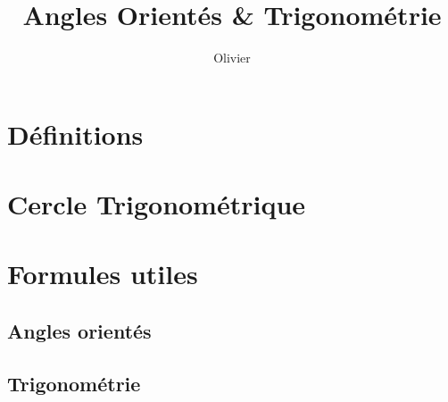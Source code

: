\documentclass[12pt,a4paper]{article}
\author{Olivier}
\date{}
\title{Angles Orientés \& Trigonométrie }
\begin{document}
\maketitle



\section{Définitions}

\begin{multicols}{2}
	
\end{multicols}



\section{Cercle Trigonométrique}


\begin{center}

\end{center}

\vspace*{2cm}

\section{Formules utiles}

\subsection*{Angles orientés}

\begin{multicols}{2}

\end{multicols}


\subsection*{Trigonométrie}

\begin{multicols}{2}
	
\end{multicols}


%


%

%

\end{document}
